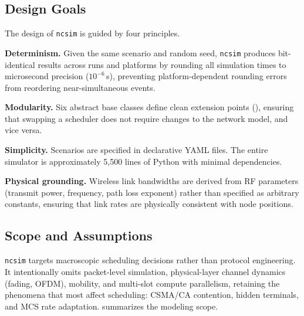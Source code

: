 \documentclass[conference]{IEEEtran}
\newcommand{\ncsim}{\texttt{ncsim}}
\begin{document}
\subsection{Design Goals}

The design of \ncsim{} is guided by four principles.

\textbf{Determinism.}  Given the same scenario and random seed, \ncsim{}
produces bit-identical results across runs and platforms by rounding all
simulation times to microsecond precision ($10^{-6}$\,s), preventing
platform-dependent rounding errors from reordering near-simultaneous events.

\textbf{Modularity.}  Six abstract base classes define clean extension
points (), ensuring that swapping a scheduler does
not require changes to the network model, and vice versa.

\textbf{Simplicity.}  Scenarios are specified in declarative YAML files.
The entire simulator is approximately 5,500 lines of Python with minimal
dependencies.  

\textbf{Physical grounding.}  Wireless link bandwidths are derived from RF
parameters (transmit power, frequency, path loss exponent) rather than
specified as arbitrary constants, ensuring that link rates are physically
consistent with node positions.

\subsection{Scope and Assumptions}

\ncsim{} targets macroscopic scheduling decisions rather than protocol
engineering.  It intentionally omits packet-level simulation, physical-layer
channel dynamics (fading, OFDM), mobility, and multi-slot compute
parallelism, retaining the phenomena that most affect scheduling: CSMA/CA
contention, hidden terminals, and MCS rate adaptation.
 summarizes the modeling scope.
\end{document}
